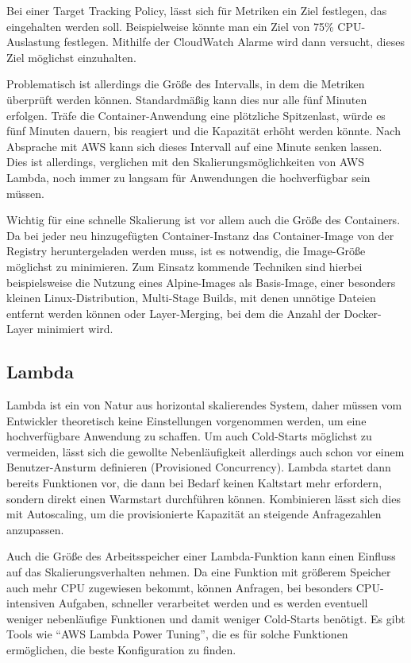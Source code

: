 Bei einer Target Tracking Policy, lässt sich für Metriken ein Ziel festlegen, das eingehalten werden soll. Beispielweise könnte man ein Ziel von 75\% CPU-Auslastung festlegen. Mithilfe der CloudWatch Alarme wird dann versucht, dieses Ziel möglichst einzuhalten. 

Problematisch ist allerdings die Größe des Intervalls, in dem die Metriken überprüft werden können. Standardmäßig kann dies nur alle fünf Minuten erfolgen. Träfe die Container-Anwendung eine plötzliche Spitzenlast, würde es fünf Minuten dauern, bis reagiert und die Kapazität erhöht werden könnte. Nach Absprache mit AWS kann sich dieses Intervall auf eine Minute senken lassen. Dies ist allerdings, verglichen mit den Skalierungsmöglichkeiten von AWS Lambda, noch immer zu langsam für Anwendungen die hochverfügbar sein müssen.

Wichtig für eine schnelle Skalierung ist vor allem auch die Größe des Containers. Da bei jeder neu hinzugefügten Container-Instanz das Container-Image von der Registry heruntergeladen werden muss, ist es notwendig, die Image-Größe möglichst zu minimieren. Zum Einsatz kommende Techniken sind hierbei beispielsweise die Nutzung eines Alpine-Images als Basis-Image, einer besonders kleinen Linux-Distribution, Multi-Stage Builds, mit denen unnötige Dateien entfernt werden können oder Layer-Merging, bei dem die Anzahl der Docker-Layer minimiert wird.


\subsection{Lambda}
Lambda ist ein von Natur aus horizontal skalierendes System, daher müssen vom Entwickler theoretisch keine Einstellungen vorgenommen werden, um eine hochverfügbare Anwendung zu schaffen. Um auch Cold-Starts möglichst zu vermeiden, lässt sich die gewollte Nebenläufigkeit allerdings auch schon vor einem Benutzer-Ansturm definieren (Provisioned Concurrency). Lambda startet dann bereits Funktionen vor, die dann bei Bedarf keinen Kaltstart mehr erfordern, sondern direkt einen Warmstart durchführen können. Kombinieren lässt sich dies mit Autoscaling, um die provisionierte Kapazität an steigende Anfragezahlen anzupassen. 

Auch die Größe des Arbeitsspeicher einer Lambda-Funktion kann einen Einfluss auf das Skalierungsverhalten nehmen. Da eine Funktion mit größerem Speicher auch mehr CPU zugewiesen bekommt, können Anfragen, bei besonders CPU-intensiven Aufgaben, schneller verarbeitet werden und es werden eventuell weniger nebenläufige Funktionen und damit weniger Cold-Starts benötigt. Es gibt Tools wie "`AWS Lambda Power Tuning"'\cite{casalboni_alexcasalboniaws-lambda-power-tuning_2021}, die es für solche Funktionen ermöglichen, die beste Konfiguration zu finden.

